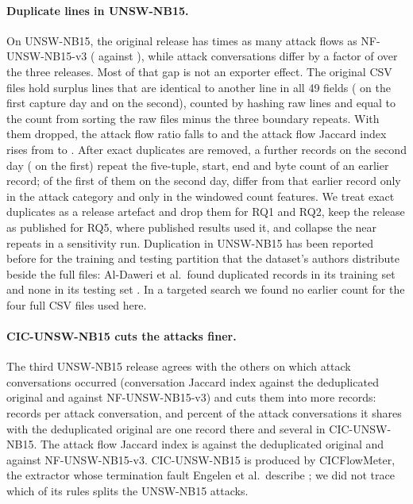 \documentclass[pdflatex,sn-mathphys-num]{sn-jnl}
\newcommand{\docnum}[1]{#1}
\theoremstyle{thmstyleone}%
\theoremstyle{thmstylethree}%
\begin{document}
\paragraph{Duplicate lines in UNSW-NB15.} On UNSW-NB15, the original release has \RQoneUnswAttackRatio{} times as many attack flows as NF-UNSW-NB15-v3 (\RQoneUnswAttackOrig{} against \RQoneUnswAttackVthree{}), while attack conversations differ by a factor of \RQoneUnswAttackConvRatio{} over the three releases. Most of that gap is not an exporter effect. The original CSV files hold \RQoneUnswDups{} surplus lines that are identical to another line in all \docnum{49} fields (\RQoneUnswDupsA{} on the first capture day and \RQoneUnswDupsB{} on the second), counted by hashing raw lines and equal to the count from sorting the raw files minus the three boundary repeats. With them dropped, the attack flow ratio falls to \RQoneUnswAttackRatioDedup{} and the attack flow Jaccard index rises from \RQoneUnswAttackJaccard{} to \RQoneUnswAttackJaccardDedup{}. After exact duplicates are removed, a further \RQoneNearB{} records on the second day (\RQoneNearA{} on the first) repeat the five-tuple, start, end and byte count of an earlier record; of the first \RQoneNearSample{} of them on the second day, \RQoneNearAttackCat{} differ from that earlier record only in the attack category and \RQoneNearCt{} only in the windowed count features. We treat exact duplicates as a release artefact and drop them for RQ1 and RQ2, keep the release as published for RQ5, where published results used it, and collapse the near repeats in a sensitivity run. Duplication in UNSW-NB15 has been reported before for the training and testing partition that the dataset's authors distribute beside the full files: Al-Daweri et al.\ found duplicated records in its training set and none in its testing set \cite{aldaweri2020}. In a targeted search we found no earlier count for the four full CSV files used here.

\paragraph{CIC-UNSW-NB15 cuts the attacks finer.} The third UNSW-NB15 release agrees with the others on which attack conversations occurred (conversation Jaccard index \RQoneUnswAttackConvJaccardOrigCicDedup{} against the deduplicated original and \RQoneUnswAttackConvJaccardVthreeCic{} against NF-UNSW-NB15-v3) and cuts them into more records: \RQoneCicUnswAttackFpc{} records per attack conversation, and \RQoneUnswAttackOneNOrigCicDedup{} percent of the attack conversations it shares with the deduplicated original are one record there and several in CIC-UNSW-NB15. The attack flow Jaccard index is \RQoneUnswAttackJaccardOrigCicDedup{} against the deduplicated original and \RQoneUnswAttackJaccardVthreeCic{} against NF-UNSW-NB15-v3. CIC-UNSW-NB15 is produced by CICFlowMeter, the extractor whose termination fault Engelen et al.\ describe \cite{engelen2021}; we did not trace which of its rules splits the UNSW-NB15 attacks.
\end{document}
